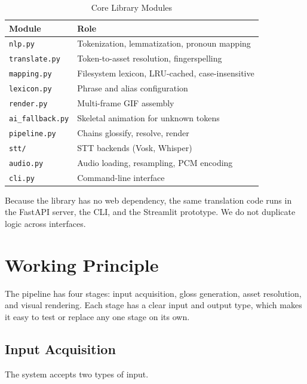 \documentclass[conference]{IEEEtran}
\begin{document}
\begin{table}[t]
\centering
\caption{Core Library Modules}
\label{tab:modules}
\begin{tabular}{@{}ll@{}}
\toprule
\textbf{Module} & \textbf{Role} \\
\midrule
\texttt{nlp.py} & Tokenization, lemmatization, pronoun mapping \\
\texttt{translate.py} & Token-to-asset resolution, fingerspelling \\
\texttt{mapping.py} & Filesystem lexicon, LRU-cached, case-insensitive \\
\texttt{lexicon.py} & Phrase and alias configuration \\
\texttt{render.py} & Multi-frame GIF assembly \\
\texttt{ai\_fallback.py} & Skeletal animation for unknown tokens \\
\texttt{pipeline.py} & Chains glossify, resolve, render \\
\texttt{stt/} & STT backends (Vosk, Whisper) \\
\texttt{audio.py} & Audio loading, resampling, PCM encoding \\
\texttt{cli.py} & Command-line interface \\
\bottomrule
\end{tabular}
\end{table}

Because the library has no web dependency, the same translation code runs in the FastAPI server, the CLI, and the Streamlit prototype. We do not duplicate logic across interfaces.

\section{Working Principle}
\label{sec:method}

The pipeline has four stages: input acquisition, gloss generation, asset resolution, and visual rendering. Each stage has a clear input and output type, which makes it easy to test or replace any one stage on its own.

\subsection{Input Acquisition}

The system accepts two types of input.
\end{document}
